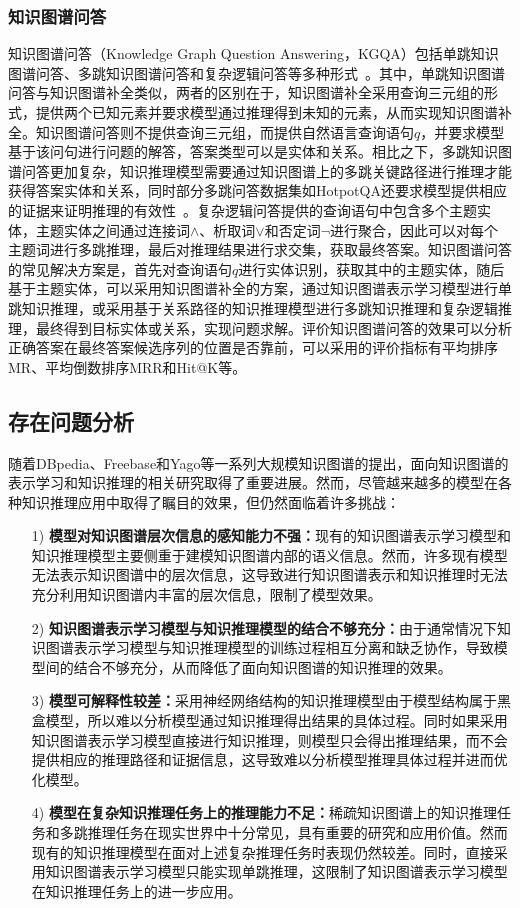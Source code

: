\documentclass[algorithmlist, AutoFakeBold, AutoFakeSlant, figurelist, tablelist, nomlist, engineering, openany]{seuthesix} %
\begin{document}
\subsubsection{知识图谱问答}
知识图谱问答（Knowledge Graph Question Answering，KGQA）包括单跳知识图谱问答、多跳知识图谱问答和复杂逻辑问答等多种形式~\cite{saxena2020improving}。其中，单跳知识图谱问答与知识图谱补全类似，两者的区别在于，知识图谱补全采用查询三元组的形式，提供两个已知元素并要求模型通过推理得到未知的元素，从而实现知识图谱补全。知识图谱问答则不提供查询三元组，而提供自然语言查询语句$q$，并要求模型基于该问句进行问题的解答，答案类型可以是实体和关系。相比之下，多跳知识图谱问答更加复杂，知识推理模型需要通过知识图谱上的多跳关键路径进行推理才能获得答案实体和关系，同时部分多跳问答数据集如HotpotQA还要求模型提供相应的证据来证明推理的有效性~\cite{yang2018hotpotqa}。复杂逻辑问答提供的查询语句中包含多个主题实体，主题实体之间通过连接词$\land$、析取词$\vee$和否定词$\neg$进行聚合，因此可以对每个主题词进行多跳推理，最后对推理结果进行求交集，获取最终答案。知识图谱问答的常见解决方案是，首先对查询语句$q$进行实体识别，获取其中的主题实体，随后基于主题实体，可以采用知识图谱补全的方案，通过知识图谱表示学习模型进行单跳知识推理，或采用基于关系路径的知识推理模型进行多跳知识推理和复杂逻辑推理，最终得到目标实体或关系，实现问题求解。评价知识图谱问答的效果可以分析正确答案在最终答案候选序列的位置是否靠前，可以采用的评价指标有平均排序MR、平均倒数排序MRR和Hit@K等。


\subsection{存在问题分析}
随着DBpedia、Freebase和Yago等一系列大规模知识图谱的提出，面向知识图谱的表示学习和知识推理的相关研究取得了重要进展。然而，尽管越来越多的模型在各种知识推理应用中取得了瞩目的效果，但仍然面临着许多挑战：
\begin{itemize}
  \item [1)]\textbf{模型对知识图谱层次信息的感知能力不强：}现有的知识图谱表示学习模型和知识推理模型主要侧重于建模知识图谱内部的语义信息。然而，许多现有模型无法表示知识图谱中的层次信息，这导致进行知识图谱表示和知识推理时无法充分利用知识图谱内丰富的层次信息，限制了模型效果。
  \item [2)]\textbf{知识图谱表示学习模型与知识推理模型的结合不够充分：}由于通常情况下知识图谱表示学习模型与知识推理模型的训练过程相互分离和缺乏协作，导致模型间的结合不够充分，从而降低了面向知识图谱的知识推理的效果。
  \item [3)]\textbf{模型可解释性较差：}采用神经网络结构的知识推理模型由于模型结构属于黑盒模型，所以难以分析模型通过知识推理得出结果的具体过程。同时如果采用知识图谱表示学习模型直接进行知识推理，则模型只会得出推理结果，而不会提供相应的推理路径和证据信息，这导致难以分析模型推理具体过程并进而优化模型。
  \item [4)]\textbf{模型在复杂知识推理任务上的推理能力不足：}稀疏知识图谱上的知识推理任务和多跳推理任务在现实世界中十分常见，具有重要的研究和应用价值。然而现有的知识推理模型在面对上述复杂推理任务时表现仍然较差。同时，直接采用知识图谱表示学习模型只能实现单跳推理，这限制了知识图谱表示学习模型在知识推理任务上的进一步应用。
\end{itemize}
\end{document}
